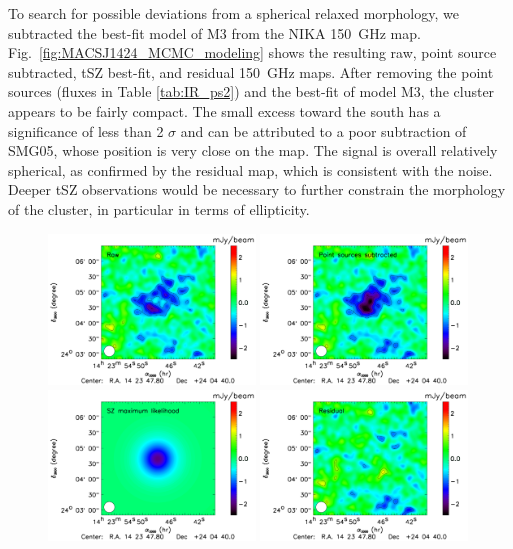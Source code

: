 \documentclass[traditabstract]{aa}
\begin{document}
To search for possible deviations from a spherical relaxed morphology, we subtracted the best-fit model of M3 from the NIKA 150~GHz map. Fig.~\ref{fig:MACSJ1424_MCMC_modeling} shows the resulting raw, point source subtracted, tSZ best-fit, and residual 150~GHz maps. After removing the point sources (fluxes in Table \ref{tab:IR_ps2}) and the best-fit of model M3, the cluster appears to be fairly compact. The small excess toward the south has a significance of less than 2 $\sigma$ and can be attributed to a poor subtraction of SMG05, whose position is very close on the map. The signal is overall relatively spherical, as confirmed by the residual map, which is consistent with the noise. Deeper tSZ observations would be necessary  to further constrain the morphology of the cluster, in particular in terms of ellipticity.
\begin{figure}[h]
\centering
\includegraphics[width=0.49\textwidth]{Figure/MCMC_raw_map.pdf}
\includegraphics[width=0.49\textwidth]{Figure/MCMC_point_source_removed.pdf}
\includegraphics[width=0.49\textwidth]{Figure/MCMC_best_fit.pdf}
\includegraphics[width=0.49\textwidth]{Figure/MCMC_residual.pdf}

\end{figure}
\end{document}
